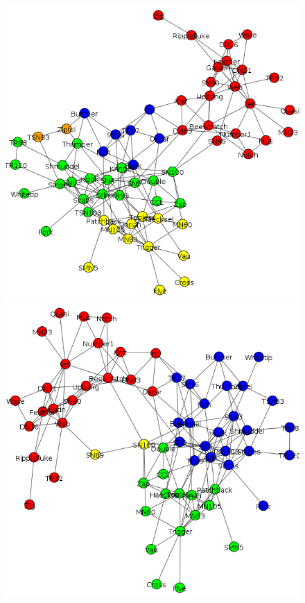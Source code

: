 \begin{figure}
\centering
\includegraphics[scale = 0.22]{graph_Edge_betweenness}
\includegraphics[scale = 0.22]{graph_Fast_greedy} \\

\end{figure}
